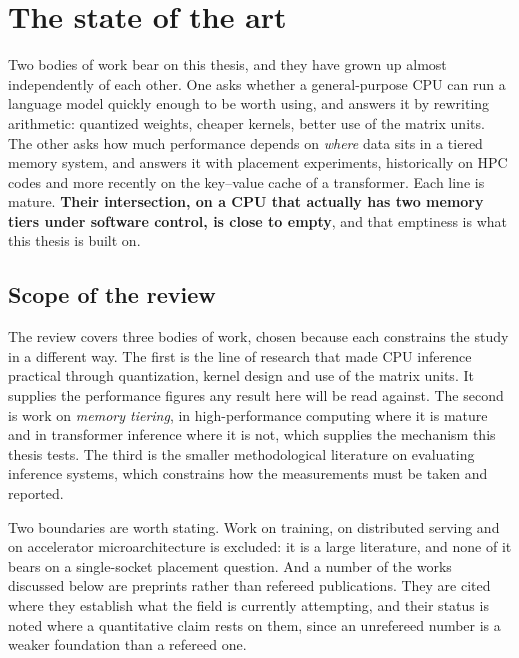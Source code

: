 
\section{The state of the art}
\label{sec:literature}

Two bodies of work bear on this thesis, and they have grown up almost
independently of each other.  One asks whether a general-purpose CPU can
run a language model quickly enough to be worth using, and answers it by
rewriting arithmetic: quantized weights, cheaper kernels, better use of
the matrix units.  The other asks how much performance depends on
\emph{where} data sits in a tiered memory system, and answers it with
placement experiments, historically on HPC codes and more recently on
the key--value cache of a transformer.  Each line is mature.  \textbf{Their intersection, on a CPU that
actually has two memory tiers under software control, is close to
empty}, and that emptiness is what this thesis is built on.

\subsection{Scope of the review}

The review covers three bodies of work, chosen because each constrains
the study in a different way.  The first is the line of research that
made CPU inference practical through quantization, kernel design and use
of the matrix units.  It supplies the performance figures any result
here will be read against.  The second is work on \emph{memory tiering},
in high-performance computing where it is mature and in transformer
inference where it is not, which supplies the mechanism this thesis
tests.  The third is the smaller methodological literature on evaluating
inference systems, which constrains how the measurements must be taken
and reported.

Two boundaries are worth stating.  Work on training, on distributed
serving and on accelerator microarchitecture is excluded: it is a large
literature, and none of it bears on a single-socket placement question.
And a number of the works discussed below are preprints rather than
refereed publications.  They are cited where they establish what the
field is currently attempting, and their status is noted where a
quantitative claim rests on them, since an unrefereed number is a weaker
foundation than a refereed one.

